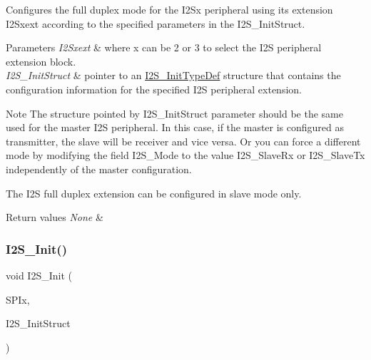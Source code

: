Configures the full duplex mode for the I2\+Sx peripheral using its extension I2\+Sxext according to the specified parameters in the I2\+S\+\_\+\+Init\+Struct. 


\begin{DoxyParams}{Parameters}
{\em I2\+Sxext} & where x can be 2 or 3 to select the I2S peripheral extension block. \\
\hline
{\em I2\+S\+\_\+\+Init\+Struct} & pointer to an \mbox{\hyperlink{struct_i2_s___init_type_def}{I2\+S\+\_\+\+Init\+Type\+Def}} structure that contains the configuration information for the specified I2S peripheral extension.\\
\hline
\end{DoxyParams}
\begin{DoxyNote}{Note}
The structure pointed by I2\+S\+\_\+\+Init\+Struct parameter should be the same used for the master I2S peripheral. In this case, if the master is configured as transmitter, the slave will be receiver and vice versa. Or you can force a different mode by modifying the field I2\+S\+\_\+\+Mode to the value I2\+S\+\_\+\+Slave\+Rx or I2\+S\+\_\+\+Slave\+Tx independently of the master configuration. ~\newline
 

The I2S full duplex extension can be configured in slave mode only. ~\newline
 
\end{DoxyNote}

\begin{DoxyRetVals}{Return values}
{\em None} & \\
\hline
\end{DoxyRetVals}
\mbox{\label{group___s_p_i___group1_ga53661884ae4a9640df7cbc59187782f7}} 
\subsubsection{\texorpdfstring{I2\+S\+\_\+\+Init()}{I2S\_Init()}}
{\footnotesize\ttfamily void I2\+S\+\_\+\+Init (\begin{DoxyParamCaption}\item[{S\+P\+I\+\_\+\+Type\+Def $\ast$}]{S\+P\+Ix,  }\item[{\mbox{\hyperlink{struct_i2_s___init_type_def}{I2\+S\+\_\+\+Init\+Type\+Def}} $\ast$}]{I2\+S\+\_\+\+Init\+Struct }\end{DoxyParamCaption})}



